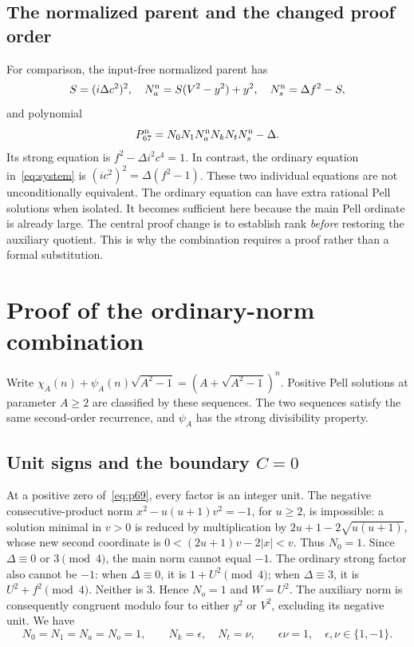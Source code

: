\documentclass[11pt,a4paper]{article}
\theoremstyle{remark}\newtheorem{remark}[theorem]{Remark}
\begin{document}
\subsection{The normalized parent and the changed proof order}
For comparison, the input-free normalized parent has
\[
 S=(i\Delta c^2)^2,\quad N_a^{\rm n}=S(V^2-y^2)+y^2,
 \quad N_s^{\rm n}=\Delta f^2-S,
\]
and polynomial
\begin{equation}
 P_{67}^{\rm n}=N_0N_1N_a^{\rm n}N_kN_tN_s^{\rm n}-\Delta.
 \label{eq:normalized}
\end{equation}
Its strong equation is \(f^2-\Delta i^2c^4=1\). In contrast,
the ordinary equation in~\eqref{eq:system} is
\((ic^2)^2=\Delta(f^2-1)\). These two individual equations are not
unconditionally equivalent. The ordinary equation can have extra
rational Pell solutions when isolated. It becomes sufficient here
because the main Pell ordinate is already large. The central proof
change is to establish rank \emph{before} restoring the auxiliary
quotient. This is why the combination requires a proof rather than a
formal substitution.

\section{Proof of the ordinary-norm combination}\label{sec:ordinaryproof}
Write \(\chi_A(n)+\psi_A(n)\sqrt{A^2-1}=(A+\sqrt{A^2-1})^n\).
Positive Pell solutions at parameter \(A\ge2\) are classified by these
sequences. The two sequences satisfy the same second-order recurrence,
and \(\psi_A\) has the strong divisibility property.

\subsection{Unit signs and the boundary \texorpdfstring{\(C=0\)}{C=0}}
At a positive zero of~\eqref{eq:p69}, every factor is an integer unit.
The negative consecutive-product norm
\(x^2-u(u+1)v^2=-1\), for \(u\ge2\), is impossible: a solution
minimal in \(v>0\) is reduced by multiplication by
\(2u+1-2\sqrt{u(u+1)}\), whose new second coordinate is
\(0<(2u+1)v-2|x|<v\). Thus \(N_0=1\).
Since \(\Delta\equiv0\) or \(3\pmod4\), the main norm cannot
equal \(-1\). The ordinary strong factor also cannot be \(-1\):
when \(\Delta\equiv0\), it is \(1+U^2\pmod4\); when
\(\Delta\equiv3\), it is \(U^2+f^2\pmod4\). Neither is 3.
Hence \(N_o=1\) and \(W=U^2\). The auxiliary norm is consequently
congruent modulo four to either \(y^2\) or \(V^2\), excluding its
negative unit. We have
\[
 N_0=N_1=N_a=N_o=1,\qquad N_k=\epsilon,\quad N_t=\nu,
 \qquad\epsilon\nu=1,
 \quad\epsilon,\nu\in\{1,-1\}.
\]
\end{document}
